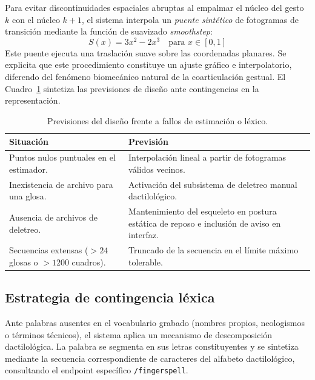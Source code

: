 Para evitar discontinuidades espaciales abruptas al empalmar el núcleo del gesto $k$ con el núcleo $k+1$, el sistema interpola un \textit{puente sintético} de fotogramas de transición mediante la función de suavizado \textit{smoothstep}:
\begin{equation}
S(x) = 3x^2 - 2x^3 \quad \text{para } x \in [0, 1]
\label{eq:smoothstep}
\end{equation}
Este puente ejecuta una traslación suave sobre las coordenadas planares. Se explicita que este procedimiento constituye un ajuste gráfico e interpolatorio, diferendo del fenómeno biomecánico natural de la coarticulación gestual. El Cuadro~\ref{tab:salvaguardas_pose} sintetiza las previsiones de diseño ante contingencias en la representación.

\begin{table}[H]
  \centering
  \small
  \caption{Previsiones del diseño frente a fallos de estimación o léxico.}
  \label{tab:salvaguardas_pose}
  \begin{tabularx}{\textwidth}{@{}>{\raggedright\arraybackslash}p{} >{\raggedright\arraybackslash}X@{}}
    \toprule
    \textbf{Situación} & \textbf{Previsión} \\
    \midrule
    Puntos nulos puntuales en el estimador. & Interpolación lineal a partir de fotogramas válidos vecinos. \\
    \addlinespace[2pt]
    Inexistencia de archivo para una glosa. & Activación del subsistema de deletreo manual dactilológico. \\
    \addlinespace[2pt]
    Ausencia de archivos de deletreo. & Mantenimiento del esqueleto en postura estática de reposo e inclusión de aviso en interfaz. \\
    \addlinespace[2pt]
    Secuencias extensas ($>24$ glosas o $>1200$ cuadros). & Truncado de la secuencia en el límite máximo tolerable. \\
    \bottomrule
  \end{tabularx}
\end{table}

\subsection{Estrategia de contingencia léxica}
Ante palabras ausentes en el vocabulario grabado (nombres propios, neologismos o términos técnicos), el sistema aplica un mecanismo de descomposición dactilológica. La palabra se segmenta en sus letras constituyentes y se sintetiza mediante la secuencia correspondiente de caracteres del alfabeto dactilológico, consultando el endpoint específico \texttt{/fingerspell}.

